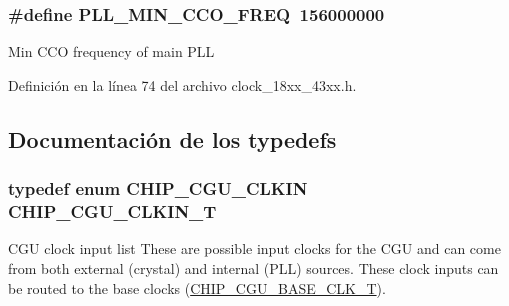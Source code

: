 \subsubsection[{\texorpdfstring{P\+L\+L\+\_\+\+M\+I\+N\+\_\+\+C\+C\+O\+\_\+\+F\+R\+EQ}{PLL_MIN_CCO_FREQ}}]{\setlength{\rightskip}{0pt plus 5cm}\#define P\+L\+L\+\_\+\+M\+I\+N\+\_\+\+C\+C\+O\+\_\+\+F\+R\+EQ~156000000}\hypertarget{group___c_l_o_c_k__18_x_x__43_x_x_ga1b275f6e0df5d06ec980f9da9e3a1f02}{}\label{group___c_l_o_c_k__18_x_x__43_x_x_ga1b275f6e0df5d06ec980f9da9e3a1f02}
Min C\+CO frequency of main P\+LL 

Definición en la línea 74 del archivo clock\+\_\+18xx\+\_\+43xx.\+h.



\subsection{Documentación de los \textquotesingle{}typedefs\textquotesingle{}}
\subsubsection[{\texorpdfstring{C\+H\+I\+P\+\_\+\+C\+G\+U\+\_\+\+C\+L\+K\+I\+N\+\_\+T}{CHIP_CGU_CLKIN_T}}]{\setlength{\rightskip}{0pt plus 5cm}typedef enum {\bf C\+H\+I\+P\+\_\+\+C\+G\+U\+\_\+\+C\+L\+K\+IN}  {\bf C\+H\+I\+P\+\_\+\+C\+G\+U\+\_\+\+C\+L\+K\+I\+N\+\_\+T}}\hypertarget{group___c_l_o_c_k__18_x_x__43_x_x_ga0975326707efebf2b074283e6c602f18}{}\label{group___c_l_o_c_k__18_x_x__43_x_x_ga0975326707efebf2b074283e6c602f18}


C\+GU clock input list These are possible input clocks for the C\+GU and can come from both external (crystal) and internal (P\+LL) sources. These clock inputs can be routed to the base clocks (\hyperlink{chip__clocks_8h_a31e266dd83cc66eb866d8d051ffd1d45}{C\+H\+I\+P\+\_\+\+C\+G\+U\+\_\+\+B\+A\+S\+E\+\_\+\+C\+L\+K\+\_\+T}). 

